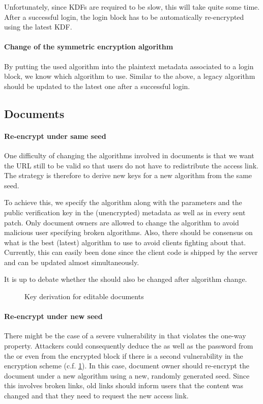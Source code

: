 \documentclass[a4paper, 11pt]{article}
\begin{document}
Unfortunately, since KDFs are required to be slow, this will take quite some time.
After a successful login, the login block has to be automatically re-encrypted using the latest KDF.

\paragraph{Change of the symmetric encryption algorithm}
By putting the used algorithm into the plaintext metadata associated to a login block, we know which algorithm to use.
Similar to the above, a legacy algorithm should be updated to the latest one after a successful login.

\subsection{Documents}
\label{sec:documents}

\paragraph{Re-encrypt under same seed}
One difficulty of changing the algorithms involved in documents is that we want the URL still to be valid so that users do not have to redistribute the access link.
The strategy is therefore to derive new keys for a new algorithm from the same seed.

To achieve this, we specify the algorithm along with the parameters and the public verification key in the (unencrypted) metadata as well as in every sent patch.
Only document owners are allowed to change the algorithm to avoid malicious user specifying broken algorithms.
Also, there should be consensus on what is the best (latest) algorithm to use to avoid clients fighting about that.
Currently, this can easily been done since the client code is shipped by the server and can be updated almost simultaneously.

It is up to debate whether the \mychanID should also be changed after algorithm change.


\begin{figure}[t]
  \centering
  
  \caption{Key derivation for editable documents}
  \label{fig:key_derivation}
\end{figure}


\paragraph{Re-encrypt under new seed}
There might be the case of a severe vulnerability in  that violates the one-way property.
Attackers could consequently deduce the \myEditKeyStr as well as the password from the \myViewKeyStr or even from the encrypted block if there is a second vulnerability in the encryption scheme (c.f. \cref{fig:key_derivation}).
In this case, document owner should re-encrypt the document under a new algorithm using a new, randomly generated seed.
Since this involves broken links, old links should inform users that the content was changed and that they need to request the new access link.
\end{document}

